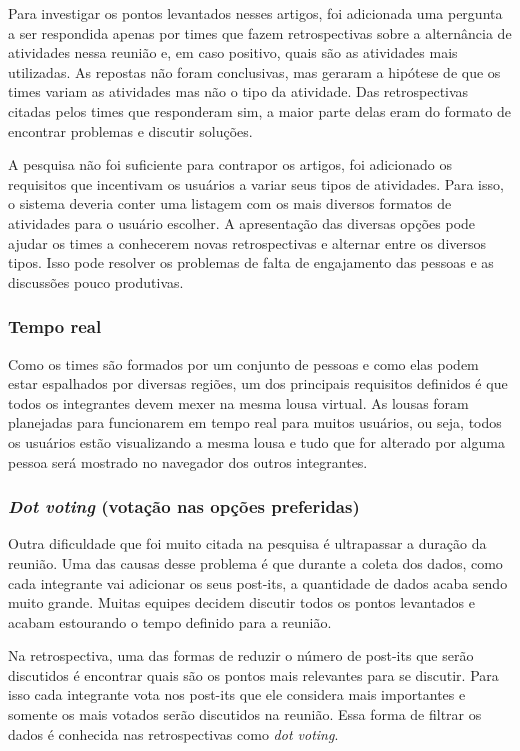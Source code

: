 Para investigar os pontos levantados nesses artigos, foi adicionada uma pergunta a ser respondida apenas por times que fazem retrospectivas sobre a alternância de atividades nessa reunião e, em caso positivo, quais são as atividades mais utilizadas. As repostas não foram conclusivas, mas geraram a hipótese de que os times variam as atividades mas não o tipo da atividade. Das retrospectivas citadas pelos times que responderam sim, a maior parte delas eram do formato de encontrar problemas e discutir soluções. 

A pesquisa não foi suficiente para contrapor os artigos, foi adicionado os requisitos que incentivam os usuários a variar seus tipos de atividades. Para isso, o sistema deveria conter uma listagem com os mais diversos formatos de atividades para o usuário escolher. A apresentação das diversas opções pode ajudar os times a conhecerem novas retrospectivas e alternar entre os diversos tipos. Isso pode resolver os  problemas de falta de engajamento das pessoas e as discussões pouco produtivas.

\subsubsection*{Tempo real}

Como os times são formados por um conjunto de pessoas e como elas podem estar espalhados por diversas regiões, um dos principais requisitos definidos é que todos os integrantes devem mexer na mesma lousa virtual. As lousas foram planejadas  para funcionarem em tempo real para muitos usuários, ou seja, todos os usuários estão visualizando a mesma lousa e tudo que for alterado por alguma pessoa será mostrado no navegador dos outros integrantes.

\subsubsection*{\textit{Dot voting} (votação nas opções preferidas)}

Outra dificuldade que foi muito citada na pesquisa é ultrapassar a duração da reunião. Uma das causas desse problema é que durante a coleta dos dados, como cada integrante vai adicionar os seus post-its, a quantidade de dados acaba sendo muito grande. Muitas equipes decidem discutir todos os pontos levantados e acabam estourando o tempo definido para a reunião.

Na retrospectiva, uma das formas de reduzir o número de post-its que serão discutidos é encontrar quais são os pontos mais relevantes para se discutir. Para isso cada integrante vota nos post-its que ele considera mais importantes e somente os mais votados serão discutidos na reunião. Essa forma de filtrar os dados é conhecida nas retrospectivas como \textit{dot voting}.

